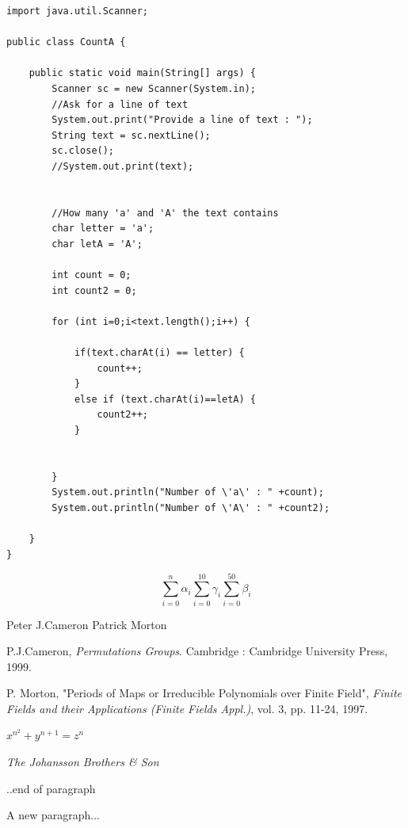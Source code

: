 \documentclass{article}
\begin{document}
\break

\lstset{style=Java}

\begin{lstlisting}
import java.util.Scanner;

public class CountA {

    public static void main(String[] args) {
        Scanner sc = new Scanner(System.in);
        //Ask for a line of text
        System.out.print("Provide a line of text : ");
        String text = sc.nextLine();
        sc.close();
        //System.out.print(text);


        //How many 'a' and 'A' the text contains
        char letter = 'a';
        char letA = 'A';

        int count = 0;
        int count2 = 0;

        for (int i=0;i<text.length();i++) {

            if(text.charAt(i) == letter) {
                count++;
            }
            else if (text.charAt(i)==letA) {
                count2++;
            }


        }
        System.out.println("Number of \'a\' : " +count);
        System.out.println("Number of \'A\' : " +count2);

    }
}
\end{lstlisting}
\newcommand{\summation}[2]{\sum_{i=0}^{#1}{#2}_i}

\begin{equation}
\summation{n}{\alpha}
\summation{10}{\gamma}
\summation{50}{\beta}
\end{equation}

Peter J.Cameron\cite{Peter J.Cameron}
Patrick Morton\cite{Patrick Morton}

\begin{thebibliography}{2}
P.J.Cameron, \emph{Permutations Groups}. Cambridge : Cambridge University Press, 1999.

 P. Morton, "Periods of Maps or Irreducible Polynomials over Finite Field", \emph{Finite Fields and their Applications (Finite Fields Appl.)}, vol. 3, pp. 11-24, 1997.
\end{thebibliography}

\break
$x^{n^{2}} + y^{n+1} = z^{n}$
\begin{center}
\emph{The Johansson Brothers \& Son}
\end{center}
..end of paragraph 

	A new paragraph...



\end{document}

